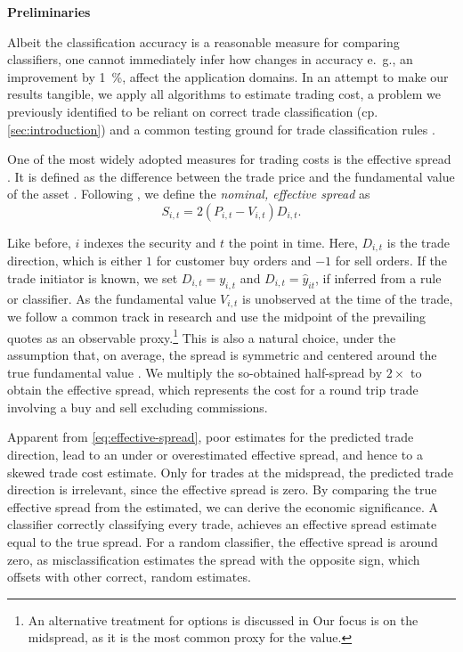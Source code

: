\textbf{Preliminaries}

Albeit the classification accuracy is a reasonable measure for comparing classifiers, one cannot immediately infer how changes in accuracy e.~g., an improvement by \SI{1}{\percent}, affect the application domains. In an attempt to make our results tangible, we apply all algorithms to estimate trading cost, a problem we previously identified to be reliant on correct trade classification (cp. \cref{sec:introduction}) and a common testing ground for trade classification rules \autocites[cp.][540--541]{ellisAccuracyTradeClassification2000}[][569--570]{finucaneDirectTestMethods2000}[][271--278]{petersonEvaluationBiasesExecution2003}[][896--897]{savickasInferringDirectionOption2003}.

One of the most widely adopted measures for trading costs is the effective spread \autocite[][112]{Piwowar_2006}. It is defined as the difference between the trade price and the fundamental value of the asset \autocite[][238--239]{bessembinderIssuesAssessingTrade2003}. Following \textcite[][238--239]{bessembinderIssuesAssessingTrade2003}, we define the \emph{nominal, effective spread} as
\begin{equation}
    S_{i,t} = 2 (P_{i,t} - V_{i,t}) D_{i,t}.
    \label{eq:effective-spread}
\end{equation}

Like before, $i$ indexes the security and $t$ the point in time. Here, $D_{i,t}$ is the trade direction, which is either $1$ for customer buy orders and $-1$ for sell orders. If the trade initiator is known, we set $D_{i,t} = y_{i,t}$ and $D_{i,t}=\hat{y}_{it}$, if inferred from a rule or classifier. As the fundamental value $V_{i,t}$ is unobserved at the time of the trade, we follow a common track in research and use the midpoint of the prevailing quotes as an observable proxy.\footnote{An alternative treatment for options is discussed in \textcite[][4975--4976]{muravyevOptionsTradingCosts2020} Our focus is on the midspread, as it is the most common proxy for the value.} This is also a natural choice, under the assumption that, on average, the spread is symmetric and centered around the true fundamental value \autocite[][1018]{leeMarketIntegrationPrice1993}. We multiply the so-obtained half-spread by $2 \times$ to obtain the effective spread, which represents the cost for a round trip trade involving a buy and sell excluding commissions.

Apparent from \cref{eq:effective-spread}, poor estimates for the predicted trade direction, lead to an under or overestimated effective spread, and hence to a skewed trade cost estimate. Only for trades at the midspread, the predicted trade direction is irrelevant, since the effective spread is zero. By comparing the true effective spread from the estimated, we can derive the economic significance. A classifier correctly classifying every trade, achieves an effective spread estimate equal to the true spread. For a random classifier, the effective spread is around zero, as misclassification estimates the spread with the opposite sign, which offsets with other correct, random estimates.

